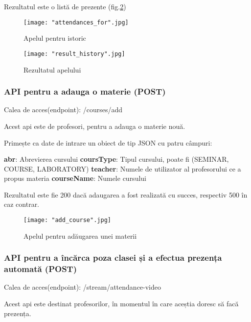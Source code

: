 \documentclass[a4paper, 12pt]{article}
\begin{document}
	\quad Rezultatul este o listă de prezente (fig.\ref{fig:result_history})
	\begin{figure}[!htb]
		\centering
		\texttt{[image: "attendances\_for".jpg]}
		\caption{Apelul pentru istoric}\label{fig:get_history}
	\end{figure}
	\begin{figure}[!htb]
		\centering
		\texttt{[image: "result\_history".jpg]}
		\caption{Rezultatul apelului}\label{fig:result_history}
	\end{figure}
	\bigskip
	
	\subsubsection{API pentru a adauga o materie (POST)} 
	
	\bigskip
	\quad\space\space Calea de acces(endpoint): /courses/add 
	
	Acest api este de profesori, pentru a adauga o materie nouă.
	
	\bigskip
	Primește ca date de intrare un obiect de tip JSON\textbf{\cite{bray2017javascript}} cu patru câmpuri:
	
	\begin{outline}
		\1 \textbf{abr}: Abrevierea cursului
		\1 \textbf{coursType}: Tipul cursului, poate fi (SEMINAR, COURSE, LABORATORY)
		\1 \textbf{teacher}: Numele de utilizator al profesorului ce a propus materia
		\1 \textbf{courseName}: Numele cursului
	\end{outline}
	
	\quad Rezultatul este fie 200 dacă adaugarea a fost realizată cu succes, respectiv 500 în caz contrar.
	\begin{figure}[!htb]
		\centering
		\texttt{[image: "add\_course".jpg]}
		\caption{Apelul pentru adăugarea unei materii}\label{fig:add_course}
	\end{figure}
	\bigskip
	
	
	\subsubsection{API pentru a încărca poza clasei și a efectua prezența automată (POST)} 
	
	\bigskip
	\quad\space\space Calea de acces(endpoint): /stream/attendance-video 
	
	Acest api este destinat profesorilor, în momentul în care aceștia doresc să facă prezența.
	
\end{document}
